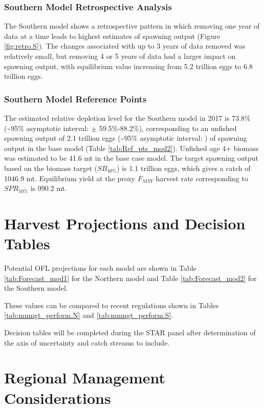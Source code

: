 \documentclass[12pt,]{article}
\begin{document}
\subsubsection{Southern Model Retrospective
Analysis}\label{southern-model-retrospective-analysis}

The Southern model shows a retrospective pattern in which removing one
year of data at a time leads to highest estimates of spawning output
(Figure \ref{fig:retro.S}). The changes associated with up to 3 years of
data removed was relatively small, but removing 4 or 5 years of data had
a larger impact on spawning output, with equilibrium value increasing
from 5.2 trillion eggs to 6.8 trillion eggs.

\subsubsection{Southern Model Reference
Points}\label{southern-model-reference-points}

The estimated relative depletion level for the Southern model in 2017 is
73.8\% (\textasciitilde{}95\% asymptotic interval: \(\pm\)
59.5\%-88.2\%), corresponding to an unfished spawning output of 2.1
trillion eggs (\textasciitilde{}95\% asymptotic interval: ) of spawning
output in the base model (Table \ref{tab:Ref_pts_mod2}). Unfished age 4+
biomass was estimated to be 41.6 mt in the base case model. The target
spawning output based on the biomass target (\(SB_{40\%}\)) is 1.1
trillion eggs, which gives a catch of 1046.9 mt. Equilibrium yield at
the proxy \(F_{MSY}\) harvest rate corresponding to \(SPR_{50\%}\) is
990.2 mt.

\section{Harvest Projections and Decision
Tables}\label{harvest-projections-and-decision-tables}

Potential OFL projections for each model are shown in Table
\ref{tab:Forecast_mod1} for the Northern model and Table
\ref{tab:Forecast_mod2} for the Southern model.

These values can be compared to recent regulations shown in Tables
\ref{tab:mnmgt_perform.N} and \ref{tab:mnmgt_perform.S}.

Decision tables will be completed during the STAR panel after
determination of the axis of uncertainty and catch streams to include.

\section{Regional Management
Considerations}\label{regional-management-considerations}
\end{document}
